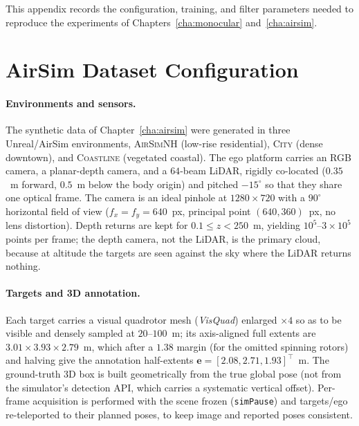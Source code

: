 
This appendix records the configuration, training, and filter parameters needed
to reproduce the experiments of Chapters~\ref{cha:monocular} and~\ref{cha:airsim}.

\section{AirSim Dataset Configuration}
\label{ap:airsim_cfg}

\paragraph*{Environments and sensors.} The synthetic data of
Chapter~\ref{cha:airsim} were generated in three Unreal/AirSim environments,
\textsc{AirSimNH} (low-rise residential), \textsc{City} (dense downtown), and
\textsc{Coastline} (vegetated coastal). The ego platform carries an RGB camera, a
planar-depth camera, and a $64$-beam LiDAR, rigidly co-located ($0.35$~m forward,
$0.5$~m below the body origin) and pitched $-15^\circ$ so that they share one
optical frame. The camera is an ideal pinhole at $1280\times720$ with a
$90^\circ$ horizontal field of view ($f_x=f_y=640$~px, principal point
$(640,360)$~px, no lens distortion). Depth returns are kept for
$0.1\le z<250$~m, yielding $10^{5}$--$3\times10^{5}$ points per frame; the depth
camera, not the LiDAR, is the primary cloud, because at altitude the targets are
seen against the sky where the LiDAR returns nothing.

\paragraph*{Targets and 3D annotation.} Each target carries a visual quadrotor
mesh (\emph{VisQuad}) enlarged $\times4$ so as to be visible and densely sampled
at $20$--$100$~m; its axis-aligned full extents are $3.01\times3.93\times2.79$~m,
which after a $1.38$ margin (for the omitted spinning rotors) and halving give the
annotation half-extents $\bm{e}=[2.08,2.71,1.93]^{\top}$~m. The ground-truth 3D box
is built geometrically from the true global pose (not from the simulator's
detection API, which carries a systematic vertical offset). Per-frame acquisition
is performed with the scene frozen (\texttt{simPause}) and targets/ego
re-teleported to their planned poses, to keep image and reported poses consistent.


